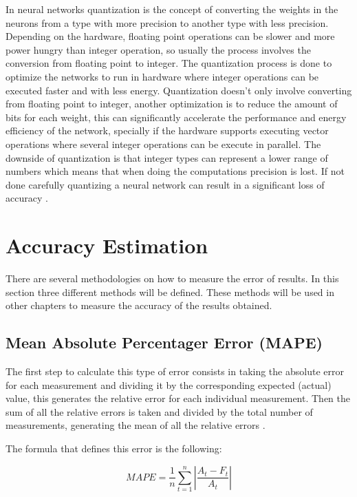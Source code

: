 In neural networks quantization is the concept of converting the weights in the neurons from a type with more precision to another type with less precision. Depending on the hardware, floating point operations can be slower and more power hungry than integer operation, so usually the process involves the conversion from floating point to integer. The quantization process is done to optimize the networks to run in hardware where integer operations can be executed faster and with less energy. Quantization doesn't only involve converting from floating point to integer, another optimization is to reduce the amount of bits for each weight, this can significantly accelerate the performance and energy efficiency of the network, specially if the hardware supports executing vector operations where several integer operations can be execute in parallel. The downside of quantization is that integer types can represent a lower range of numbers which means that when doing the computations precision is lost. If not done carefully quantizing a neural network can result in a significant loss of accuracy \cite{quant1}.

\section{Accuracy Estimation}

There are several methodologies on how to measure the error of results. In this section three different methods will be defined. These methods will be used in other chapters to measure the accuracy of the results obtained.

\subsection{Mean Absolute Percentager Error (MAPE)}

The first step to calculate this type of error consists in taking the absolute error for each measurement and dividing it by the corresponding expected (actual) value, this generates the relative error for each individual measurement. Then the sum of all the relative errors is taken and divided by the total number of measurements, generating the mean of all the relative errors \cite{DeMyttenaere2016}.

The formula that defines this error is the following:

\begin{equation}\label{eq:mape}
MAPE=\frac{1}{n}\sum_{t=1}^{n}\left| \frac{A_{t}-F_{t}}{A_{t}} \right|
\end{equation}

